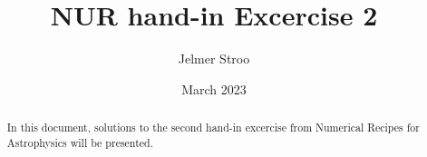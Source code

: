 \documentclass{article}
\title{NUR hand-in Excercise 2}
\author{Jelmer Stroo}
\date{March 2023}
\begin{document}
\maketitle

\begin{abstract}
    In this document, solutions to the second hand-in excercise from Numerical Recipes for Astrophysics will be presented.
\end{abstract}



\end{document}

